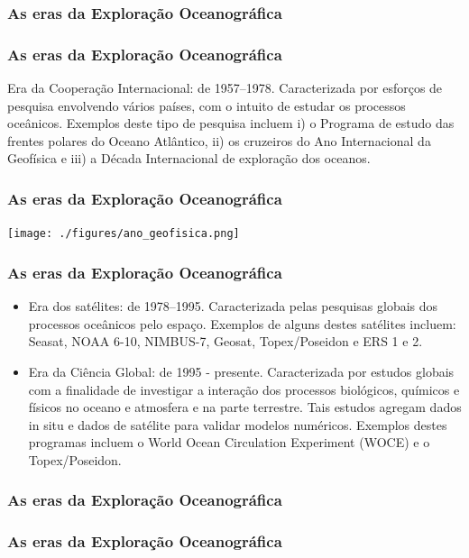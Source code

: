 \documentclass[14pt,xcolor=dvipsnames]{beamer}
\begin{document}
\begin{frame}
    \frametitle{As eras da Exploração Oceanográfica}
    \centerline{}
\end{frame}

\begin{frame}
    \frametitle{As eras da Exploração Oceanográfica}
    Era da Cooperação Internacional: de 1957--1978. Caracterizada por esforços
    de pesquisa envolvendo vários países, com o intuito de estudar os processos
    oceânicos.  Exemplos deste tipo de pesquisa incluem i) o Programa de estudo
    das frentes polares do Oceano Atlântico, ii) os cruzeiros do Ano
    Internacional da Geofísica e iii) a Década Internacional de exploração dos oceanos.
\end{frame}

\begin{frame}
    \frametitle{As eras da Exploração Oceanográfica}
    \centerline{\texttt{[image: ./figures/ano\_geofisica.png]}}
\end{frame}

\begin{frame}
    \frametitle{As eras da Exploração Oceanográfica}
    \begin{itemize}[<+-| alert@+>]
    \item \small{Era dos satélites: de 1978--1995. Caracterizada pelas pesquisas
           globais dos processos oceânicos pelo espaço. Exemplos de alguns
           destes satélites incluem: Seasat, NOAA 6-10, NIMBUS-7, Geosat,
           Topex/Poseidon e ERS 1 e 2.}

    \item \small{Era da Ciência Global: de 1995 - presente. Caracterizada por
           estudos globais com a finalidade de investigar a interação dos
           processos biológicos, químicos e físicos no oceano e atmosfera e na
           parte terrestre. Tais estudos agregam dados in situ e dados de
           satélite para validar modelos numéricos. Exemplos destes programas
           incluem o World Ocean Circulation Experiment (WOCE) e o
           Topex/Poseidon.}
    \end{itemize}
\end{frame}

\begin{frame}
    \frametitle{As eras da Exploração Oceanográfica}
    \centerline{}
\end{frame}

\begin{frame}
    \frametitle{As eras da Exploração Oceanográfica}
    \centerline{}
\end{frame}
\end{document}

